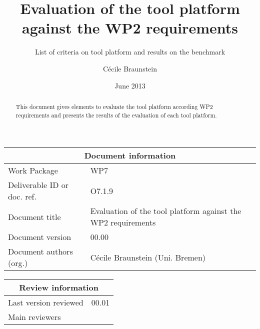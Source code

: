 \documentclass{openetcs_report}
\begin{document}
\frontmatter
{}




\title{Evaluation of the tool platform against the WP2 requirements }

\subtitle{List of criteria on tool platform and results on the benchmark}

\date{June 2013}


\author{C\'ecile Braunstein}

 


\begin{abstract}
This document gives elements to evaluate the tool platform according
WP2 requirements and presents the results of the evaluation of each
tool platform.
\end{abstract}

\maketitle
\tableofcontents
\listoffiguresandtables
\newpage


\begin{tabular}{|p{4.4cm}|p{8.7cm}|}
\hline
\multicolumn{2}{|c|}{Document information} \\
\hline
Work Package &  WP7  \\
Deliverable ID or doc. ref. & O7.1.9\\
\hline
Document title & Evaluation of the tool platform against the WP2 requirements \\
Document version & 00.00 \\
Document authors (org.)  & C\'ecile Braunstein (Uni. Bremen)  \\
\hline
\end{tabular}

\begin{tabular}{|p{4.4cm}|p{8.7cm}|}
\hline
\multicolumn{2}{|c|}{Review information} \\
\hline
Last version reviewed & 00.01 \\
\hline
Main reviewers & \\
 \hline
\end{tabular}
\end{document}
